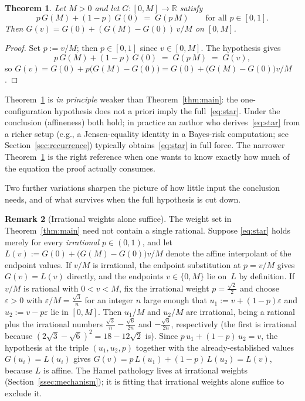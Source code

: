 \documentclass{article}
\theoremstyle{plain}
\newtheorem{theorem}{Theorem}
\theoremstyle{definition}
\newtheorem{remark}[theorem]{Remark}
\newcommand{\R}{\mathbb{R}}
\begin{document}
\begin{theorem}\label{thm:weak}
Let $M>0$ and let $G\colon[0,M]\to\R$ satisfy
\[
p\,G(M)+(1-p)\,G(0) \;=\; G(p\,M) \qquad \text{for all }p\in[0,1].
\]
Then $G(v)=G(0)+(G(M)-G(0))\,v/M$ on $[0,M]$.
\end{theorem}

\begin{proof}
Set $p:=v/M$; then $p\in[0,1]$ since $v\in[0,M]$. The hypothesis gives
\[
p\,G(M)+(1-p)\,G(0) \;=\; G(p\,M) \;=\; G(v),
\]
so $G(v)=G(0)+p\bigl(G(M)-G(0)\bigr)=G(0)+\bigl(G(M)-G(0)\bigr)v/M$.
\end{proof}

Theorem~\ref{thm:weak} is \emph{in principle} weaker than
Theorem~\ref{thm:main}: the one-configuration hypothesis does not a priori imply
the full~\eqref{eq:star}. Under the conclusion (affineness) both hold;
in practice an author who derives~\eqref{eq:star} from a richer setup
(e.g., a Jensen-equality identity in a Bayes-risk computation;
see Section~\ref{sec:recurrence}) typically obtains~\eqref{eq:star} in
full force. The narrower Theorem~\ref{thm:weak} is the right reference
when one wants to know exactly how much of the equation the proof
actually consumes.

Two further variations sharpen the picture of how little input the
conclusion needs, and of what survives when the full hypothesis is cut
down.

\begin{remark}[Irrational weights alone suffice]\label{rem:irrational}
The weight set in Theorem~\ref{thm:main} need not contain a single
rational. Suppose \eqref{eq:star} holds merely for every
\emph{irrational} $p\in(0,1)$, and let
$L(v):=G(0)+\bigl(G(M)-G(0)\bigr)v/M$ denote the affine interpolant of
the endpoint values. If $v/M$ is irrational, the endpoint substitution
at $p=v/M$ gives $G(v)=L(v)$ directly, and the endpoints $v\in\{0,M\}$
lie on~$L$ by definition. If $v/M$ is rational with
$0<v<M$, fix the irrational weight $p=\tfrac{\sqrt2}{2}$ and choose
$\varepsilon>0$ with $\varepsilon/M=\tfrac{\sqrt3}{n}$ for an integer
$n$ large enough that $u_1:=v+(1-p)\varepsilon$ and
$u_2:=v-p\varepsilon$ lie in $[0,M]$. Then $u_1/M$ and $u_2/M$ are
irrational, being a rational plus the irrational numbers
$\tfrac{\sqrt3}{n}-\tfrac{\sqrt6}{2n}$ and $-\tfrac{\sqrt6}{2n}$,
respectively (the first is irrational because
$(2\sqrt3-\sqrt6)^2=18-12\sqrt2$ is). Since $p\,u_1+(1-p)\,u_2=v$, the hypothesis at the
triple $(u_1,u_2,p)$ together with the already-established values
$G(u_i)=L(u_i)$ gives $G(v)=p\,L(u_1)+(1-p)\,L(u_2)=L(v)$, because $L$
is affine. The Hamel pathology lives at irrational weights
(Section~\ref{ssec:mechanism}); it is fitting that irrational weights
alone suffice to exclude it.
\end{remark}
\end{document}
